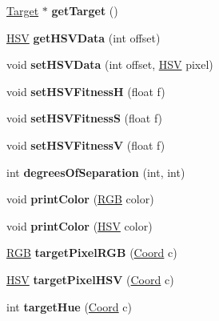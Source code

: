 \begin{DoxyCompactItemize}
\hyperlink{classTarget}{Target} $\ast$ {\bfseries get\+Target} ()
\item 
\hypertarget{classCanvas_acb06d2e4116994f32121333e69585249}{}\label{classCanvas_acb06d2e4116994f32121333e69585249} 
\hyperlink{structHSV}{H\+SV} {\bfseries get\+H\+S\+V\+Data} (int offset)
\item 
\hypertarget{classCanvas_a7fba7a894a1857c9ee2fe34441629d52}{}\label{classCanvas_a7fba7a894a1857c9ee2fe34441629d52} 
void {\bfseries set\+H\+S\+V\+Data} (int offset, \hyperlink{structHSV}{H\+SV} pixel)
\item 
\hypertarget{classCanvas_a8a7184ebaa6704048362972407787a59}{}\label{classCanvas_a8a7184ebaa6704048362972407787a59} 
void {\bfseries set\+H\+S\+V\+FitnessH} (float f)
\item 
\hypertarget{classCanvas_aa4e1c90061a6814daf5bbca65e1e398a}{}\label{classCanvas_aa4e1c90061a6814daf5bbca65e1e398a} 
void {\bfseries set\+H\+S\+V\+FitnessS} (float f)
\item 
\hypertarget{classCanvas_a068052d242a5c21a89b334224a127d19}{}\label{classCanvas_a068052d242a5c21a89b334224a127d19} 
void {\bfseries set\+H\+S\+V\+FitnessV} (float f)
\item 
\hypertarget{classCanvas_aa0c60ed66fcea208c32a2e3c8bf28923}{}\label{classCanvas_aa0c60ed66fcea208c32a2e3c8bf28923} 
int {\bfseries degrees\+Of\+Separation} (int, int)
\item 
\hypertarget{classCanvas_a56ba128080bcc03c8bb8b7d6c2cc9821}{}\label{classCanvas_a56ba128080bcc03c8bb8b7d6c2cc9821} 
void {\bfseries print\+Color} (\hyperlink{structRGB}{R\+GB} color)
\item 
\hypertarget{classCanvas_a570498c742d3e171b7be1c498f0e75f1}{}\label{classCanvas_a570498c742d3e171b7be1c498f0e75f1} 
void {\bfseries print\+Color} (\hyperlink{structHSV}{H\+SV} color)
\item 
\hypertarget{classCanvas_a95ecf73c2b84c001d12bc6dc6940091e}{}\label{classCanvas_a95ecf73c2b84c001d12bc6dc6940091e} 
\hyperlink{structRGB}{R\+GB} {\bfseries target\+Pixel\+R\+GB} (\hyperlink{structCoord}{Coord} c)
\item 
\hypertarget{classCanvas_a04b66e5e405d8785984a01d7b8dc639c}{}\label{classCanvas_a04b66e5e405d8785984a01d7b8dc639c} 
\hyperlink{structHSV}{H\+SV} {\bfseries target\+Pixel\+H\+SV} (\hyperlink{structCoord}{Coord} c)
\item 
\hypertarget{classCanvas_aa8c5064fd62e3aa1fde2bf94b806281e}{}\label{classCanvas_aa8c5064fd62e3aa1fde2bf94b806281e} 
int {\bfseries target\+Hue} (\hyperlink{structCoord}{Coord} c)

\end{DoxyCompactItemize}
